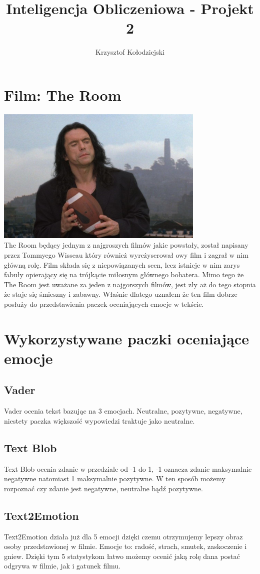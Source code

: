 \documentclass[a4paper,12pt]{article}
\title{Inteligencja Obliczeniowa - Projekt 2}
\author{Krzysztof Kołodziejski}
\begin{document}
	\maketitle
	\section {Film: The Room}
	{\includegraphics[width=10cm]{johnny.jpg}}\\
	The Room będący jednym z najgroszych filmów jakie powstały, został napisany przez Tommyego Wisseau który również wyreżyserował owy film i zagrał w nim główną rolę.
	Film składa się z niepowiązanych scen, lecz istnieje w nim zarys fabuły opierający się na trójkącie miłosnym głównego bohatera.
	Mimo tego że The Room jest uważane za jeden z najgorszych filmów, jest zły aż do tego stopnia że staje się śmieszny i zabawny. Właśnie dlatego uznałem że ten film dobrze posłuży do przedstawienia paczek oceniających emocje w tekście.
	\clearpage
	\section {Wykorzystywane paczki oceniające emocje}
	\subsection{Vader}
	Vader ocenia tekst bazując na 3 emocjach. Neutralne, pozytywne, negatywne, niestety paczka większość wypowiedzi traktuje jako neutralne.
	\subsection{Text Blob}
	Text Blob ocenia zdanie w przedziale od -1 do 1, -1 oznacza zdanie maksymalnie negatywne natomiast 1 maksymalnie pozytywne. W ten sposób możemy rozpoznać czy zdanie jest negatywne, neutralne bądź pozytywne.
	\subsection{Text2Emotion}
	Text2Emotion działa już dla 5 emocji dzięki czemu otrzymujemy lepszy obraz osoby przedstawionej w filmie.
	Emocje to: radość, strach, smutek, zaskoczenie i gniew.
	Dzięki tym 5 statystykom łatwo możemy ocenić jaką rolę dana postać odgrywa w filmie, jak i gatunek filmu.
\end{document}
